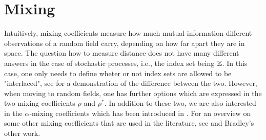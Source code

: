 \section{Mixing}

Intuitively, mixing coefficients measure how much mutual information different observations of a random field carry, depending on how far apart they are in space.
The question how to measure distance does not have many different answers in the case of stochastic processes, i.e., the index set being $\mathbb{Z}$. In this case, one only needs to define wheter or not index sets are allowed to be "interlaced", see \cite{bradley2001interlaced} for a demonstration of the difference between the two.
However, when moving to random fields, one has further options which are expressed in the two mixing coefficients $\rho$ and $\rho^*$. In addition to these two, we are also interested in the $\alpha$-mixing coefficients which has been introduced in \cite{rosenblatt1956central}. For an overview on some other mixing coefficients that are used in the literature, see \cite{bradley1986basic} and Bradley's other work.


